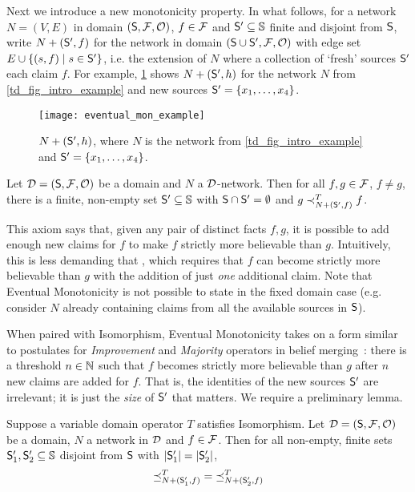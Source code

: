 Next we introduce a new monotonicity property. In what follows, for a network
$N = (V, E)$ in domain $(\S, \F, \O)$, $f \in \F$ and $\S' \subseteq \uS$
finite and disjoint from $\S$, write $N + (\S', f)$ for the network in domain
$(\S \cup \S', \F, \O)$ with edge set $E \cup \{(s, f) \mid s \in \S'\}$, i.e.
the extension of $N$ where a collection of `fresh' sources $\S'$ each claim
$f$. For example, \cref{td_fig_eventual_mon_example} shows $N + (\S', h)$ for the
network $N$ from \cref{td_fig_intro_example} and new sources $\S' = \{x_1, \ldots,
x_4\}$.

\begin{figure}[b]
\centering
\texttt{[image: eventual\_mon\_example]}
\caption{
    $N + (\S', h)$, where $N$ is the network from \cref{td_fig_intro_example} and
    $\S' = \{x_1, \ldots, x_4\}$.
}
\label{td_fig_eventual_mon_example}
\end{figure}

\begin{axiom}
    Let $\D = (\S, \F, \O)$ be a domain and $N$ a $\D$-network. Then for all
    $f, g \in \F$, $f \ne g$, there is a finite, non-empty set $\S' \subseteq
    \uS$ with $\S \cap \S' = \emptyset$ and $g \flt_{N + (\S', f)}^T f$.
\end{axiom}

This axiom says that, given any pair of distinct facts $f, g$, it is possible
to add enough new claims for $f$ to make $f$ strictly more believable than $g$.
Intuitively, this is less demanding that \monotonicity{}, which requires that $f$
can become strictly more believable than $g$ with the addition of just
\emph{one} additional claim. Note that Eventual Monotonicity is not possible to
state in the fixed domain case (e.g. consider $N$ already containing claims
from all the available sources in $\S$).

When paired with Isomorphism, Eventual Monotonicity takes on a form similar to
postulates for \emph{Improvement} and \emph{Majority} operators in belief
merging~\cite{koniecznyP08_improvement,konieczny2002merging}: there is a
threshold $n \in \Nat$ such that $f$ becomes strictly more believable than $g$
after $n$ new claims are added for $f$. That is, the identities of the new
sources $\S'$ are irrelevant; it is just the \emph{size} of $\S'$ that matters.
We require a preliminary lemma.

\begin{lemma}
    \label{td_lemma_isomorphism_var_op}
    Suppose a variable domain operator $T$ satisfies Isomorphism. Let $\D = (\S,
    \F, \O)$ be a domain, $N$ a network in $\D$ and $f \in \F$. Then for all
    non-empty, finite sets $\S'_1, \S'_2 \subseteq \uS$ disjoint from $\S$ with
    $|\S'_1| = |\S'_2|$,
    \[
        {\fle_{N + (\S'_1, f)}^T}
        =
        {\fle_{N + (\S'_2, f)}^T}
    \]
\end{lemma}

